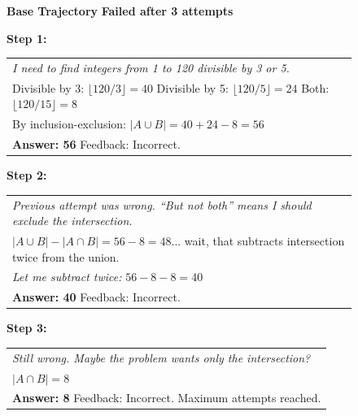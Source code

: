 \begin{figure}[b]
\centering

\begin{tcolorbox}[
    colback=white,
    colframe=black!70,
    title=\textbf{DAPO: How many integers from 1 to 120 are divisible by 3 or 5 but not both?},
    fonttitle=\bfseries\small,
    width=\textwidth,
    boxrule=0.5pt
]

\textbf{Base Trajectory} \hfill \textcolor{red!70!black}{\textbf{Failed after 3 attempts}}

\vspace{0.5em}

\footnotesize
\textbf{Step 1:}
\begin{tabular}{@{}p{14.5cm}@{}}
\textit{I need to find integers from 1 to 120 divisible by 3 or 5.} \\[0.2em]
Divisible by 3: $\lfloor 120/3 \rfloor = 40$ \quad Divisible by 5: $\lfloor 120/5 \rfloor = 24$ \quad Both: $\lfloor 120/15 \rfloor = 8$ \\[0.2em]
By inclusion-exclusion: $|A \cup B| = 40 + 24 - 8 = 56$ \\[0.2em]
\textbf{Answer: 56} \quad \textcolor{red!70!black}{Feedback: Incorrect.}
\end{tabular}

\vspace{0.5em}

\textbf{Step 2:}
\footnotesize
\begin{tabular}{@{}p{14.5cm}@{}}
\textit{Previous attempt was wrong. ``But not both'' means I should exclude the intersection.} \\[0.2em]
$|A \cup B| - |A \cap B| = 56 - 8 = 48$... wait, that subtracts intersection twice from the union. \\[0.2em]
\textit{Let me subtract twice:} $56 - 8 - 8 = 40$ \\[0.2em]
\textbf{Answer: 40} \quad \textcolor{red!70!black}{Feedback: Incorrect.}
\end{tabular}

\vspace{0.5em}

\textbf{Step 3:}
\footnotesize
\begin{tabular}{@{}p{14.5cm}@{}}
\textit{Still wrong. Maybe the problem wants only the intersection?} \\[0.2em]
$|A \cap B| = 8$ \\[0.2em]
\textbf{Answer: 8} \quad \textcolor{red!70!black}{Feedback: Incorrect. Maximum attempts reached.}
\end{tabular}


\end{tcolorbox}
\end{figure}
